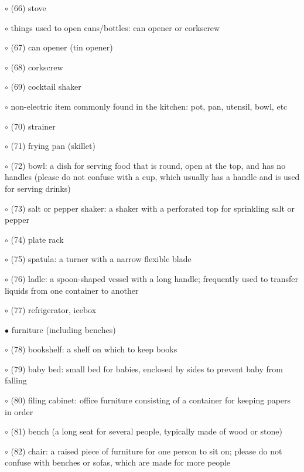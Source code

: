 \noindent \leftskip=0.25cm $\circ$ (66) stove

\noindent \leftskip=0.25cm $\circ$ things used to open cans/bottles: can opener or corkscrew

\noindent \leftskip=0.5cm $\circ$ (67) can opener (tin opener)

\noindent \leftskip=0.5cm $\circ$ (68) corkscrew

\noindent \leftskip=0.25cm $\circ$ (69) cocktail shaker

\noindent \leftskip=0.25cm $\circ$ non-electric item commonly found in the kitchen: pot, pan, utensil, bowl, etc

\noindent \leftskip=0.5cm $\circ$ (70) strainer

\noindent \leftskip=0.5cm $\circ$ (71) frying pan (skillet)

\noindent \leftskip=0.5cm $\circ$ (72) bowl: a dish for serving food that is round, open at the top, and has no handles (please do not confuse with a cup, which usually has a handle and is used for serving drinks)

\noindent \leftskip=0.5cm $\circ$ (73) salt or pepper shaker: a shaker with a perforated top for sprinkling salt or pepper

\noindent \leftskip=0.5cm $\circ$ (74) plate rack

\noindent \leftskip=0.5cm $\circ$ (75) spatula: a turner with a narrow flexible blade

\noindent \leftskip=0.5cm $\circ$ (76) ladle: a spoon-shaped vessel with a long handle; frequently used to transfer liquids from one container to another

\noindent \leftskip=0.25cm $\circ$ (77) refrigerator, icebox

\noindent \leftskip=0.0cm $\bullet$ furniture (including benches)

\noindent \leftskip=0.25cm $\circ$ (78) bookshelf:  a shelf on which to keep books

\noindent \leftskip=0.25cm $\circ$ (79) baby bed: small bed for babies, enclosed by sides to prevent baby from falling

\noindent \leftskip=0.25cm $\circ$ (80) filing cabinet: office furniture consisting of a container for keeping papers in order

\noindent \leftskip=0.25cm $\circ$ (81) bench (a long seat for several people, typically made of wood or stone)

\noindent \leftskip=0.25cm $\circ$ (82) chair: a raised piece of furniture for one person to sit on; please do not confuse with benches or sofas, which are made for more people

